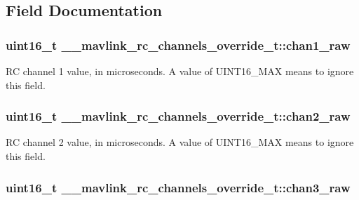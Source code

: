 \subsection{Field Documentation}
\hypertarget{struct____mavlink__rc__channels__override__t_aeb8348ef82cccce6d514fdf1d2a4d216}{
\subsubsection[{chan1\+\_\+raw}]{\setlength{\rightskip}{0pt plus 5cm}uint16\+\_\+t \+\_\+\+\_\+mavlink\+\_\+rc\+\_\+channels\+\_\+override\+\_\+t\+::chan1\+\_\+raw}}\label{struct____mavlink__rc__channels__override__t_aeb8348ef82cccce6d514fdf1d2a4d216}


R\+C channel 1 value, in microseconds. A value of U\+I\+N\+T16\+\_\+\+M\+A\+X means to ignore this field. 

\hypertarget{struct____mavlink__rc__channels__override__t_ab3632a873125a666e50f889d854a41d4}{
\subsubsection[{chan2\+\_\+raw}]{\setlength{\rightskip}{0pt plus 5cm}uint16\+\_\+t \+\_\+\+\_\+mavlink\+\_\+rc\+\_\+channels\+\_\+override\+\_\+t\+::chan2\+\_\+raw}}\label{struct____mavlink__rc__channels__override__t_ab3632a873125a666e50f889d854a41d4}


R\+C channel 2 value, in microseconds. A value of U\+I\+N\+T16\+\_\+\+M\+A\+X means to ignore this field. 

\hypertarget{struct____mavlink__rc__channels__override__t_aaf6d972bf21b65c73095fc5c45aff71a}{
\subsubsection[{chan3\+\_\+raw}]{\setlength{\rightskip}{0pt plus 5cm}uint16\+\_\+t \+\_\+\+\_\+mavlink\+\_\+rc\+\_\+channels\+\_\+override\+\_\+t\+::chan3\+\_\+raw}}\label{struct____mavlink__rc__channels__override__t_aaf6d972bf21b65c73095fc5c45aff71a}


